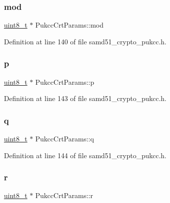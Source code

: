 \mbox{\label{structPukccCrtParams_a28cbf33af71a8582da79a64d53175bca}} 
\subsubsection{\texorpdfstring{mod}{mod}}
{\footnotesize\ttfamily \hyperlink{stdint_8h_aba7bc1797add20fe3efdf37ced1182c5}{uint8\+\_\+t} $\ast$ Pukcc\+Crt\+Params\+::mod}



Definition at line 140 of file samd51\+\_\+crypto\+\_\+pukcc.\+h.

\mbox{\label{structPukccCrtParams_ae5cd519c92bdbf2fb9b7e5e21a45b3f6}} 
\subsubsection{\texorpdfstring{p}{p}}
{\footnotesize\ttfamily \hyperlink{stdint_8h_aba7bc1797add20fe3efdf37ced1182c5}{uint8\+\_\+t} $\ast$ Pukcc\+Crt\+Params\+::p}



Definition at line 143 of file samd51\+\_\+crypto\+\_\+pukcc.\+h.

\mbox{\label{structPukccCrtParams_a6924a47a120a1720f717ef39f7160989}} 
\subsubsection{\texorpdfstring{q}{q}}
{\footnotesize\ttfamily \hyperlink{stdint_8h_aba7bc1797add20fe3efdf37ced1182c5}{uint8\+\_\+t} $\ast$ Pukcc\+Crt\+Params\+::q}



Definition at line 144 of file samd51\+\_\+crypto\+\_\+pukcc.\+h.

\mbox{\label{structPukccCrtParams_af36c7ff183f7daaf25eb305381e517f2}} 
\subsubsection{\texorpdfstring{r}{r}}
{\footnotesize\ttfamily \hyperlink{stdint_8h_aba7bc1797add20fe3efdf37ced1182c5}{uint8\+\_\+t} $\ast$ Pukcc\+Crt\+Params\+::r}



